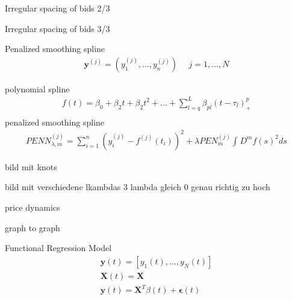 \documentclass[hyperref={pdfpagelabels=false}]{beamer}
\begin{document}
\begin{frame}{Irregular spacing of bids 2/3}
\end{frame}

\begin{frame}{Irregular spacing of bids 3/3}
\end{frame}

\begin{frame}{Penalized smoothing spline}
\begin{align*}
\mathbf{y}^{(j)}=(y_1^{(j)},...,y_n^{(j)}) \ \ \ \ \ \	 j=1,...,N 
\end{align*}

polynomial spline
\begin{align*}
f(t)=\beta_0+\beta_2t+\beta_2t^2+...+\sum_{l=q}^L \beta_{pl}(t-\tau_l)^p_+ \\ 
\end{align*}
penalized smoothing spline
\begin{align*}
PENN^{(j)}_{\lambda,m}=\sum_{i=1}^n (y_i^{(j)}-f^{(j)}(t_i))^2+\lambda PEN^{(j)}_m \int_{}^{}D^mf(s)^2 ds %
\end{align*}
\end{frame}

\begin{frame}{bild mit knots}

\end{frame}

\begin{frame}{bild mit verschiedene lkambdas 3 lambda gleich 0 genau richtig zu hoch}

\end{frame}

\begin{frame}{price dynamics}

\end{frame}

\begin{frame}
graph to graph
\end{frame}

\begin{frame}{Functional Regression Model}
\begin{align}
\mathbf{y}(t) = [y_1(t),...,y_N(t)] \nonumber \\ \mathbf{X}(t)=\mathbf{X} \nonumber \\ \mathbf{y}(t)=\mathbf{X}^T\beta(t)+\mathbf{\epsilon}(t) \nonumber
\end{align}
\end{frame}
\end{document}
